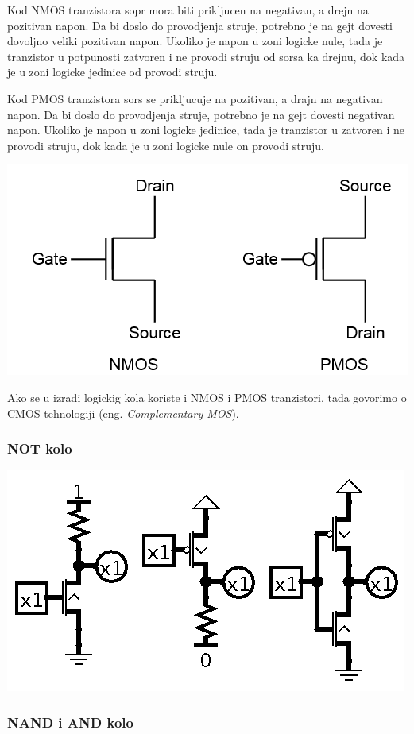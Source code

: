 \documentclass[12p,a4paper]{article}
\begin{document}
\begin{multicols}{2}
    Kod NMOS tranzistora sopr mora biti prikljucen na negativan, a drejn na 
    pozitivan napon.
    Da bi doslo do provodjenja struje, potrebno je na gejt dovesti dovoljno 
    veliki pozitivan napon.
    Ukoliko je napon u zoni logicke nule, tada je tranzistor u potpunosti 
    zatvoren i ne provodi struju od sorsa ka drejnu, dok kada je u zoni 
    logicke jedinice od provodi struju.

    Kod PMOS tranzistora sors se prikljucuje na pozitivan, a drajn na negativan
    napon. 
    Da bi doslo do provodjenja struje, potrebno je na gejt dovesti negativan 
    napon.
    Ukoliko je napon u zoni logicke jedinice, tada je tranzistor u zatvoren i
    ne provodi struju, dok kada je u zoni logicke nule on provodi struju.

    \includegraphics[width=0.8\columnwidth]{Figures/mos.png}

    Ako se u izradi logickig kola koriste i NMOS i PMOS tranzistori, tada
    govorimo o CMOS tehnologiji (eng. \emph{Complementary MOS}).

    \subsubsection{NOT kolo}

    \includegraphics[width=0.7\columnwidth]{Figures/mos_not.png}

    \subsubsection{NAND i AND kolo}


\end{multicols}
\end{document}
